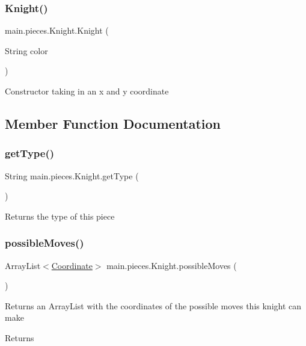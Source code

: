 \subsubsection{\texorpdfstring{Knight()}{Knight()}}
{\footnotesize\ttfamily main.\+pieces.\+Knight.\+Knight (\begin{DoxyParamCaption}\item[{String}]{color }\end{DoxyParamCaption})}

Constructor taking in an x and y coordinate 

\subsection{Member Function Documentation}
\hypertarget{classmain_1_1pieces_1_1_knight_a6c453a86bbecb2936ea4c7c472ebf360}{}\label{classmain_1_1pieces_1_1_knight_a6c453a86bbecb2936ea4c7c472ebf360} 
\subsubsection{\texorpdfstring{get\+Type()}{getType()}}
{\footnotesize\ttfamily String main.\+pieces.\+Knight.\+get\+Type (\begin{DoxyParamCaption}{ }\end{DoxyParamCaption})}

Returns the type of this piece \hypertarget{classmain_1_1pieces_1_1_knight_a9aa67ae101fd96efce020323b45511a7}{}\label{classmain_1_1pieces_1_1_knight_a9aa67ae101fd96efce020323b45511a7} 
\subsubsection{\texorpdfstring{possible\+Moves()}{possibleMoves()}}
{\footnotesize\ttfamily Array\+List$<$\hyperlink{classmain_1_1model_1_1_coordinate}{Coordinate}$>$ main.\+pieces.\+Knight.\+possible\+Moves (\begin{DoxyParamCaption}{ }\end{DoxyParamCaption})}

Returns an Array\+List with the coordinates of the possible moves this knight can make \begin{DoxyReturn}{Returns}

\end{DoxyReturn}
\hypertarget{classmain_1_1pieces_1_1_knight_aaf2e8a203e5875f9429eb528616adc53}{}\label{classmain_1_1pieces_1_1_knight_aaf2e8a203e5875f9429eb528616adc53} 
